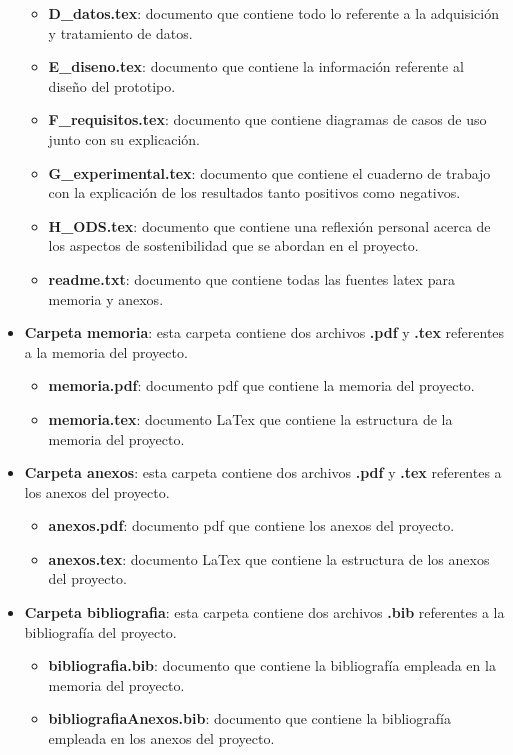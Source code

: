 \begin{itemize}
\begin{itemize}
        \item \textbf{D\_datos.tex}: documento que contiene todo lo referente a la adquisición y tratamiento de datos.
        \item \textbf{E\_diseno.tex}: documento que contiene la información referente al diseño del prototipo.
        \item \textbf{F\_requisitos.tex}: documento que contiene diagramas de casos de uso junto con su explicación.
        \item \textbf{G\_experimental.tex}: documento que contiene el cuaderno de trabajo con la explicación de los resultados tanto positivos como negativos.
        \item \textbf{H\_ODS.tex}: documento que contiene una reflexión personal acerca de los aspectos de sostenibilidad que se abordan en el proyecto.
        \item \textbf{readme.txt}: documento que contiene todas las fuentes latex para memoria y anexos.
    \end{itemize}
    \item \textbf{Carpeta memoria}: esta carpeta contiene dos archivos \textbf{.pdf} y \textbf{.tex} referentes a la memoria del proyecto.
    \begin{itemize}
        \item \textbf{memoria.pdf}: documento pdf que contiene la memoria del proyecto.
        \item \textbf{memoria.tex}: documento LaTex que contiene la estructura de la memoria del proyecto.
    \end{itemize}
    \item \textbf{Carpeta anexos}: esta carpeta contiene dos archivos \textbf{.pdf} y \textbf{.tex} referentes a los anexos del proyecto.
    \begin{itemize}
        \item \textbf{anexos.pdf}: documento pdf que contiene los anexos del proyecto.
        \item \textbf{anexos.tex}: documento LaTex que contiene la estructura de los anexos del proyecto.
    \end{itemize}
    \item \textbf{Carpeta bibliografia}: esta carpeta contiene dos archivos \textbf{.bib} referentes a la bibliografía del proyecto.
    \begin{itemize}
        \item \textbf{bibliografia.bib}: documento que contiene la bibliografía empleada en la memoria del proyecto.
        \item \textbf{bibliografiaAnexos.bib}: documento que contiene la bibliografía empleada en los anexos del proyecto.

\end{itemize}
\end{itemize}
